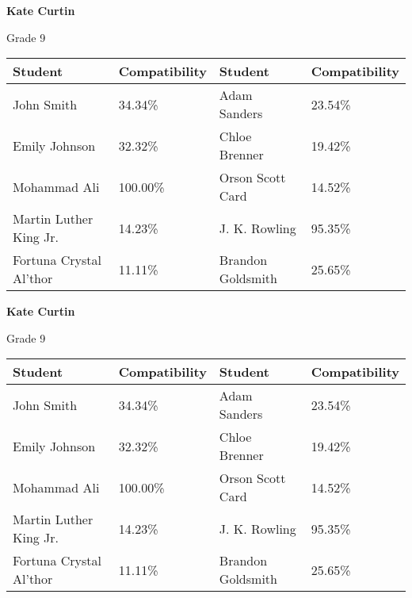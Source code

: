 \documentclass[11pt]{article}
\begin{document}
    \begin{minipage}[t][0.19\textheight][t]{\textwidth}

        \textbf{Kate Curtin}

        Grade 9

        \bigskip

        \begin{tabularx}{\textwidth}{|| Y | Y || Y | Y ||}
            Student & Compatibility & Student & Compatibility \\
            \hline
            John Smith & 34.34\% & Adam Sanders & 23.54\% \\
            Emily Johnson & 32.32\% & Chloe Brenner & 19.42\%  \\
            Mohammad Ali & 100.00\% & Orson Scott Card & 14.52\%  \\
            Martin Luther King Jr. & 14.23\% & J. K. Rowling & 95.35\%  \\
            \raggedright Fortuna Crystal Al'thor & 11.11\% & Brandon Goldsmith & 25.65\%  \\
        \end{tabularx}

    \end{minipage}
    \begin{minipage}[b][0.19\textheight][t]{\textwidth}

        \textbf{Kate Curtin}

        Grade 9

        \bigskip

        \begin{tabularx}{\textwidth}{|| Y | Y || Y | Y ||}
            Student & Compatibility & Student & Compatibility \\
            \hline
            John Smith & 34.34\% & Adam Sanders & 23.54\% \\
            Emily Johnson & 32.32\% & Chloe Brenner & 19.42\%  \\
            Mohammad Ali & 100.00\% & Orson Scott Card & 14.52\%  \\
            Martin Luther King Jr. & 14.23\% & J. K. Rowling & 95.35\%  \\
            \raggedright Fortuna Crystal Al'thor & 11.11\% & Brandon Goldsmith & 25.65\%  \\
        \end{tabularx}

    \end{minipage} \\
\end{document}
